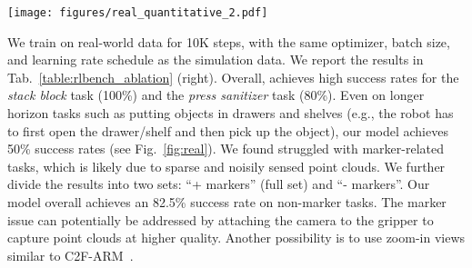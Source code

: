 \begin{figure*}[t!]
\centering
\texttt{[image: figures/real\_quantitative\_2.pdf]}
\caption{\textbf{Examples of \method in the real world.} A single \method model can perform multiple tasks (5 tasks, 13 variations) in the real world with just 10 demonstrations per task.}
\vspace{-3mm}
\label{fig:real}
\end{figure*}

We train on real-world data for 10K steps, with the same optimizer, batch size, and learning rate schedule as the simulation data. We report the results in Tab.~\ref{table:rlbench_ablation} (right). Overall, \method achieves high success rates for the \textit{stack block} task (100\%) and the \textit{press sanitizer} task (80\%). Even on longer horizon tasks such as putting objects in drawers and shelves (e.g., the robot has to first open the drawer/shelf and then pick up the object), our model achieves 50\% success rates (see Fig.~\ref{fig:real}). We found \method struggled with marker-related tasks, which is likely due to sparse and noisily sensed point clouds. We further divide the results into two sets: ``+ markers'' (full set) and ``- markers''. Our model overall achieves an 82.5\% success rate on non-marker tasks. The marker issue can potentially be addressed by attaching the camera to the gripper to capture point clouds at higher quality. Another possibility is to use zoom-in views similar to C2F-ARM~\cite{c2farm}.